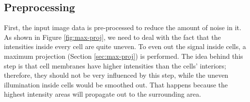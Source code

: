 \documentclass[
  digital,     %
  oneside,     %
  nosansbold,  %
  nocolorbold, %
  lof,         %
  lot,         %
]{fithesis4}
\begin{document}
\subsection{Preprocessing}
First, the input image data is pre-processed to reduce the amount of noise in it.
As shown in Figure \ref{fig:max-proj}, we need to deal with the
fact that the intensities inside every cell are quite uneven. To even out the
signal inside cells, a maximum projection (Section \ref{sec:max-proj}) is
performed. The idea behind this step is that cell membranes have higher intensities than
the cells' interiors; therefore, they should not be very influenced by this step,
while the uneven illumination inside cells would be smoothed out. That happens
because the highest intensity areas will propagate out to the surrounding area.

\begin{figure}
    \begin{subfigure}[t]{0.45\textwidth}
        \centering
        \caption{}
        \label{fig:max-proj-before}
    \end{subfigure}
    \begin{subfigure}[t]{0.45\linewidth}
        \centering

\end{subfigure}
\end{figure}
\end{document}
